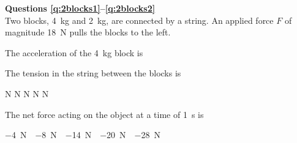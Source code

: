 \documentclass{../../../oss-classkick-exam}
\begin{document}
\genheader


\genmultidirections

\gengravity

\raggedcolumns
\begin{multicols*}{2}
  \textbf{Questions \ref{q:2blocks1}--\ref{q:2blocks2}}\\
  Two blocks, \SI{4}{\kilo\gram} and \SI{2}{\kilo\gram}, are connected by a
  string. An applied force $F$ of magnitude \SI{18}{\newton} pulls the blocks
  to the left.
  \begin{center}
  \end{center}

  \begin{questions}
    \question The acceleration of the \SI{4}{\kilo\gram} block is
    \label{q:2blocks1}
    
    \question The tension in the string between the blocks is
    \begin{choices}
       N
       N
       N
       N
       N
    \end{choices}
    \label{q:2blocks2}


    \question The net force acting on the object at a time of \SI{1}{\second} is
    \begin{choices}
      \choice\SI{-4}\newton
      \choice\SI{-8}\newton
      \choice\SI{-14}\newton
      \choice\SI{-20}\newton
      \choice\SI{-28}\newton
    \end{choices}
    \label{pos1}
    

\end{questions}
\end{multicols*}
\end{document}
